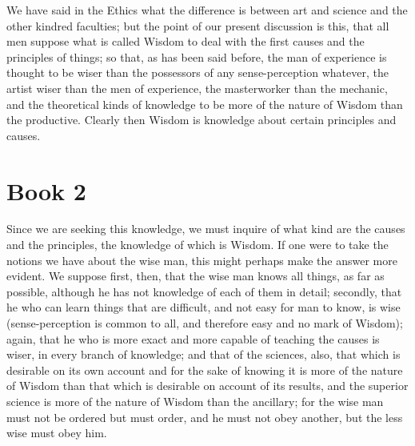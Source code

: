 \documentclass[oneside, 17pt, dvipsnames]{extbook}
\begin{document}
We have said in the Ethics what the difference is between art and science and the other kindred faculties; but the point of our present discussion is this, that all men suppose what is called Wisdom to deal with the first causes and the principles of things; so that, as has been said before, the man of experience is thought to be wiser than the possessors of any sense-perception whatever, the artist wiser than the men of experience, the masterworker than the mechanic, and the theoretical kinds of knowledge to be more of the nature of Wisdom than the productive. Clearly then Wisdom is knowledge about certain principles and causes.




\newpage
\section{Book 2}

Since we are seeking this knowledge, we must inquire of what kind are the causes and the principles, the knowledge of which is Wisdom. If one were to take the notions we have about the wise man, this might perhaps make the answer more evident. We suppose first, then, that the wise man knows all things, as far as possible, although he has not knowledge of each of them in detail; secondly, that he who can learn things that are difficult, and not easy for man to know, is wise (sense-perception is common to all, and therefore easy and no mark of Wisdom); again, that he who is more exact and more capable of teaching the causes is wiser, in every branch of knowledge; and that of the sciences, also, that which is desirable on its own account and for the sake of knowing it is more of the nature of Wisdom than that which is desirable on account of its results, and the superior science is more of the nature of Wisdom than the ancillary; for the wise man must not be ordered but must order, and he must not obey another, but the less wise must obey him.
\end{document}
